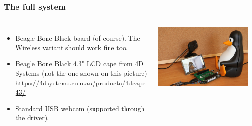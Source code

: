 \begin{frame}
  \frametitle{The full system}
  \begin{columns}
    \begin{itemize}
	\item Beagle Bone Black board (of course). The Wireless variant
	      should work fine too.
      \item Beagle Bone Black 4.3" LCD cape from 4D Systems (not the one shown on this picture)\\
	      {\small \url{https://4dsystems.com.au/products/4dcape-43/}}
        \item Standard USB webcam (supported through the 
	      driver).
    \end{itemize}
     \includegraphics[width=\textwidth]{common/beaglecam.jpg}
  \end{columns}
\end{frame}
